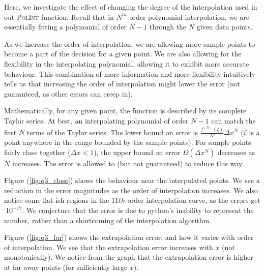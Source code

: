 \documentclass[11pt]{article}
\begin{document}
Here, we investigate the effect of changing the degree of the interpolation used in out \textsc{PolInt} function. Recall that in $N^{th}$-order polynomial interpolation, we are essentially fitting a polynomial of order $N-1$ through the $N$ given data points. 

As we increase the order of interpolation, we are allowing more sample points to become a part of the decision for a given point. We are also allowing for the flexibility in the interpolating polynomial, allowing it to exhibit more accurate behaviour. This combination of more information and more flexibility intuitively tells us that increasing the order of interpolation might lower the error (not guaranteed, as other errors can creep in). 

Mathematically, for any given point, the function is described by its complete Taylor series. At best, an interpolating polynomial of order $N-1$ can match the first $N$ terms of the Taylor series. The lower bound on error is $\frac{f^{(N)}(\zeta)}{N!}\Delta x^{N}$ ($\zeta$ is a point anywhere in the range bounded by the sample points). For sample points fairly close together ($\Delta x<1$), the upper bound on error $\Omega(\Delta x^{N})$ decreases as $N$ increases. The error is allowed to (but not guaranteed) to reduce this way.

Figure (\ref{fig:q3_close}) shows the behaviour near the interpolated points. We see a reduction in the error magnitudes as the order of interpolation increases. We also notice some flat-ish regions in the $11th$-order interpolation curve, as the errors get $~10^{-17}$. We conjecture that the error is due to python's inability to represent the number, rather than a shortcoming of the interpolation algorithm. 

Figure (\ref{fig:q3_far}) shows the extrapolation error, and how it varies with order of interpolation. We see that the extrapolation error increases with $x$ (not monotonically). We notice from the graph that the extrapolation error is higher at far away points (for sufficiently large $x$). 

\pagebreak
\end{document}
